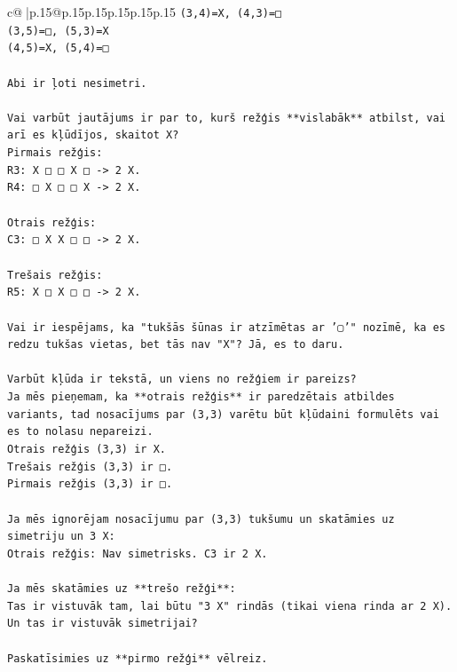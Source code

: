 \documentclass{article}
\begin{document}
{\begin{supertabular}{c@{$\;$}|p{.15\linewidth}@{}p{.15\linewidth}p{.15\linewidth}p{.15\linewidth}p{.15\linewidth}p{.15\linewidth}}
{{{\texttt{(3,4)=X, (4,3)=□} \\
\texttt{(3,5)=□, (5,3)=X} \\
\texttt{(4,5)=X, (5,4)=□} \\
\\ 
\texttt{Abi ir ļoti nesimetri.} \\
\\ 
\texttt{Vai varbūt jautājums ir par to, kurš režģis **vislabāk** atbilst, vai arī es kļūdījos, skaitot X?} \\
\texttt{Pirmais režģis:} \\
\texttt{R3: X □ □ X □ {-}> 2 X.} \\
\texttt{R4: □ X □ □ X {-}> 2 X.} \\
\\ 
\texttt{Otrais režģis:} \\
\texttt{C3: □ X X □ □ {-}> 2 X.} \\
\\ 
\texttt{Trešais režģis:} \\
\texttt{R5: X □ X □ □ {-}> 2 X.} \\
\\ 
\texttt{Vai ir iespējams, ka "tukšās šūnas ir atzīmētas ar '▢'" nozīmē, ka es redzu tukšas vietas, bet tās nav "X"? Jā, es to daru.} \\
\\ 
\texttt{Varbūt kļūda ir tekstā, un viens no režģiem ir pareizs?} \\
\texttt{Ja mēs pieņemam, ka **otrais režģis** ir paredzētais atbildes variants, tad nosacījums par (3,3) varētu būt kļūdaini formulēts vai es to nolasu nepareizi.} \\
\texttt{Otrais režģis (3,3) ir X.} \\
\texttt{Trešais režģis (3,3) ir □.} \\
\texttt{Pirmais režģis (3,3) ir □.} \\
\\ 
\texttt{Ja mēs ignorējam nosacījumu par (3,3) tukšumu un skatāmies uz simetriju un 3 X:} \\
\texttt{Otrais režģis: Nav simetrisks. C3 ir 2 X.} \\
\\ 
\texttt{Ja mēs skatāmies uz **trešo režģi**:} \\
\texttt{Tas ir vistuvāk tam, lai būtu "3 X" rindās (tikai viena rinda ar 2 X).} \\
\texttt{Un tas ir vistuvāk simetrijai?} \\
\\ 
\texttt{Paskatīsimies uz **pirmo režģi** vēlreiz.} \\
}}}
\end{supertabular}}
\end{document}
